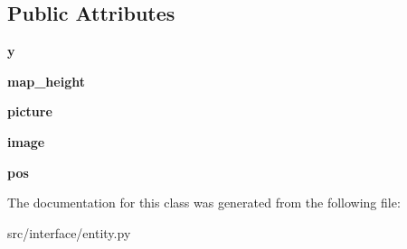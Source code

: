 \subsection*{\-Public \-Attributes}
\begin{DoxyCompactItemize}
\item 
\hypertarget{classinterface_1_1entity_1_1_entity_ae988add8b50095849685c1728b664983}{{\bfseries y}}\label{classinterface_1_1entity_1_1_entity_ae988add8b50095849685c1728b664983}

\item 
\hypertarget{classinterface_1_1entity_1_1_entity_a39d69517b193fbd597dd9e110fe72485}{{\bfseries map\-\_\-height}}\label{classinterface_1_1entity_1_1_entity_a39d69517b193fbd597dd9e110fe72485}

\item 
\hypertarget{classinterface_1_1entity_1_1_entity_a785b8e2968a9e83c39a3d12d27fb5b33}{{\bfseries picture}}\label{classinterface_1_1entity_1_1_entity_a785b8e2968a9e83c39a3d12d27fb5b33}

\item 
\hypertarget{classinterface_1_1entity_1_1_entity_ae9d2a77436bf20c3d52998f7e0f32e7d}{{\bfseries image}}\label{classinterface_1_1entity_1_1_entity_ae9d2a77436bf20c3d52998f7e0f32e7d}

\item 
\hypertarget{classinterface_1_1entity_1_1_entity_a692ddb28faef49c722bf8093c9113a58}{{\bfseries pos}}\label{classinterface_1_1entity_1_1_entity_a692ddb28faef49c722bf8093c9113a58}

\end{DoxyCompactItemize}


\-The documentation for this class was generated from the following file\-:\begin{DoxyCompactItemize}
\item 
src/interface/entity.\-py\end{DoxyCompactItemize}
